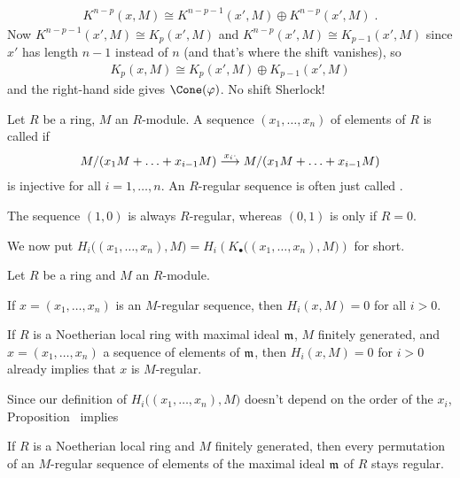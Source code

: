 \documentclass[a4paper,parskip=half,numbers=enddot, DIV=12]{scrreprt}
\begin{document}
\begin{align*}
	K^{n-p}(x,M)\cong K^{n-p-1}(x',M)\oplus K^{n-p}(x',M)\;.
\end{align*}
Now $K^{n-p-1}(x',M)\cong K_p(x',M)$ and $K^{n-p}(x',M)\cong K_{p-1}(x',M)$ since $x'$ has length $n-1$ instead of $n$ (and that's where the shift vanishes), so
\begin{align*}
	K_p(x,M)\cong K_p(x',M)\oplus K_{p-1}(x',M)
\end{align*}
and the right-hand side gives $\Cone(\phi)$. No shift Sherlock!
\begin{defi}
	Let $R$ be a ring, $M$ an $R$-module. A sequence $(x_1,\ldots,x_n)$ of elements of $R$ is called  if
	\begin{align*}
		M/(x_1M+\ldots+x_{i-1}M)\morphism[x_i\cdot ]M/(x_1M+\ldots+x_{i-1}M)
	\end{align*}
	is injective for all $i=1,\ldots,n$. An $R$-regular sequence is often just called .
\end{defi}
\begin{example}
	The sequence $(1,0)$ is always $R$-regular, whereas $(0,1)$ is only if $R=0$.
\end{example}
We now put $H_i\big((x_1,\ldots,x_n),M\big)=H_i\left(K_\bullet\big((x_1,\ldots,x_n),M\big)\right)$ for short.
\begin{prop}
	Let $R$ be a ring and $M$ an $R$-module.
	\begin{alphanumerate}
		\item If $x=(x_1,\ldots,x_n)$ is an $M$-regular sequence, then $H_i(x,M)=0$ for all $i>0$.
		\item If $R$ is a Noetherian local ring with maximal ideal $\mathfrak{m}$, $M$ finitely generated, and $x=(x_1,\ldots,x_n)$ a sequence of elements of $\mathfrak{m}$, then $H_i(x,M)=0$ for $i>0$ already implies that $x$ is $M$-regular.
	\end{alphanumerate}
\end{prop}
Since our definition of $H_i\big((x_1,\ldots,x_n),M\big)$ doesn't depend on the order of the $x_i$, Proposition~ implies
\begin{cor}
	If $R$ is a Noetherian local ring and $M$ finitely generated, then every permutation of an $M$-regular sequence of elements of the maximal ideal $\mathfrak{m}$ of $R$ stays regular.
\end{cor}
\end{document}
